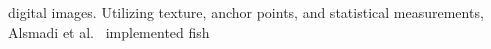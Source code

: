 \documentclass[screen,review]{acmart}
\begin{document}
digital images.
Utilizing texture, anchor points, and statistical measurements,
Alsmadi et al.~\cite{Alsmadi2019RFE} implemented fish
\end{document}

